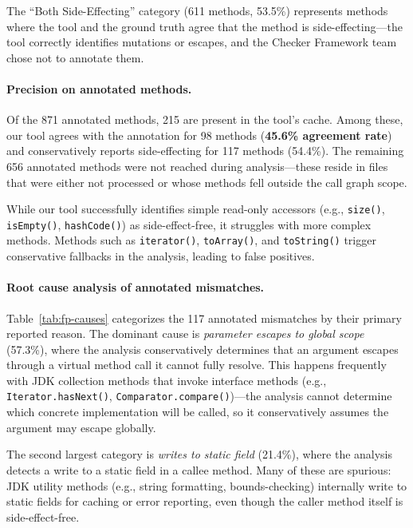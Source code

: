 The ``Both Side-Effecting'' category (611 methods, 53.5\%) represents methods where the tool and the ground truth agree that the method is side-effecting---the tool correctly identifies mutations or escapes, and the Checker Framework team chose not to annotate them.

\paragraph{Precision on annotated methods.}
Of the 871 annotated methods, 215 are present in the tool's cache.
Among these, our tool agrees with the annotation for 98 methods (\textbf{45.6\% agreement rate}) and conservatively reports side-effecting for 117 methods (54.4\%).
The remaining 656 annotated methods were not reached during analysis---these reside in files that were either not processed or whose methods fell outside the call graph scope.

While our tool successfully identifies simple read-only accessors (e.g., \texttt{size()}, \texttt{isEmpty()}, \texttt{hashCode()}) as side-effect-free, it struggles with more complex methods.
Methods such as \texttt{iterator()}, \texttt{toArray()}, and \texttt{toString()} trigger conservative fallbacks in the analysis, leading to false positives.

\paragraph{Root cause analysis of annotated mismatches.}
Table~\ref{tab:fp-causes} categorizes the 117 annotated mismatches by their primary reported reason.
The dominant cause is \emph{parameter escapes to global scope} (57.3\%), where the analysis conservatively determines that an argument escapes through a virtual method call it cannot fully resolve.
This happens frequently with JDK collection methods that invoke interface methods (e.g., \texttt{Iterator.hasNext()}, \texttt{Comparator.compare()})---the analysis cannot determine which concrete implementation will be called, so it conservatively assumes the argument may escape globally.

The second largest category is \emph{writes to static field} (21.4\%), where the analysis detects a write to a static field in a callee method.
Many of these are spurious: JDK utility methods (e.g., string formatting, bounds-checking) internally write to static fields for caching or error reporting, even though the caller method itself is side-effect-free.

